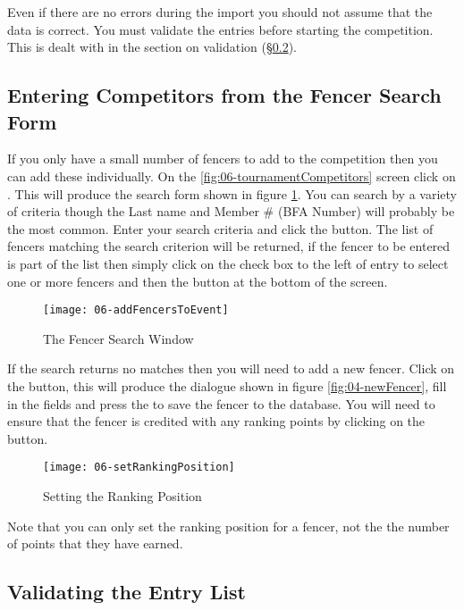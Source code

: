 \documentclass[a4paper,11pt]{memoir}
\begin{document}
Even if there are no errors during the import you should not assume that the data is correct. You must validate the entries before starting the competition. This is dealt with in the section on validation (\S\ref{sec:validation}).

\subsection{Entering Competitors from the Fencer Search Form}
If you only have a small number of fencers to add to the competition then you can add these individually. On the \ref{fig:06-tournamentCompetitors} screen click on . This will produce the search form shown in figure \ref{fig:06-addFencersToEvent}. You can search by a variety of criteria though the Last name and Member \# (BFA Number) will probably be the most common. Enter your search criteria and click the  button. The list of fencers matching the search criterion will be returned, if the fencer to be entered is part of the list then simply click on the check box to the left of entry to select one or more fencers and then the  button at the bottom of the screen.

\begin{figure}[!ht]
 \centering
 \texttt{[image: 06-addFencersToEvent]}
 \caption{The Fencer Search Window} \label{fig:06-addFencersToEvent}
\end{figure}

If the search returns no matches then you will need to add a new fencer. Click on the  button, this will produce the dialogue shown in figure \ref{fig:04-newFencer}, fill in the fields and press the  to save the fencer to the database. You will need to ensure that the fencer is credited with any ranking points by clicking on the  button.

\begin{figure}[!ht]
 \centering
 \texttt{[image: 06-setRankingPosition]}
 \caption{Setting the Ranking Position} \label{fig:06-setRankingPosition}
\end{figure}

Note that you can only set the ranking position for a fencer, not the the number of points that they have earned.

\subsection{Validating the Entry List}\label{sec:validation}
\end{document}
